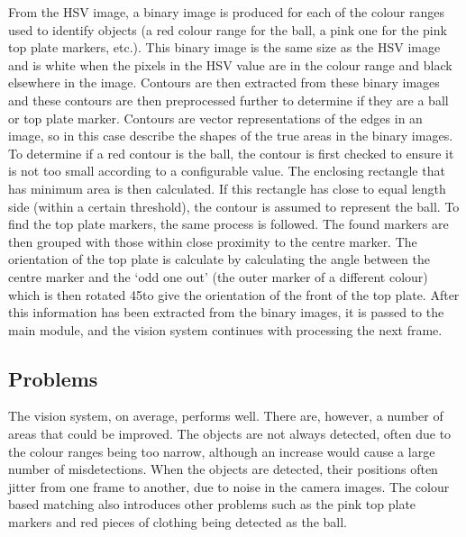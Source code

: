 From the HSV image, a binary image is produced for each of the colour ranges
used to identify objects (a red colour range for the ball, a pink one for the
pink top plate markers, etc.). This binary image is the same size as the HSV
image and is white when the pixels in the HSV value are in the colour range and
black elsewhere in the image.  Contours are then extracted from these binary
images and these contours are then preprocessed further to determine if they
are a ball or top plate marker.  Contours are vector representations of the
edges in an image, so in this case describe the shapes of the true areas in the
binary images. To determine if a red contour is the ball, the contour is first
checked to ensure it is not too small according to a configurable value. The
enclosing rectangle that has minimum area is then calculated. If this rectangle
has close to equal length side (within a certain threshold), the contour is
assumed to represent the ball. To find the top plate markers, the same process
is followed. The found markers are then grouped with those within close
proximity to the centre marker. The orientation of the top plate is calculate
by calculating the angle between the centre marker and the `odd one out' (the
outer marker of a different colour) which is then rotated 45\degree to give the
orientation of the front of the top plate.  After this information has been
extracted from the binary images, it is passed to the main module, and the
vision system continues with processing the next frame.



\subsection{Problems}

The vision system, on average, performs well. There are, however, a number of
areas that could be improved. The objects are not always detected, often due to
the colour ranges being too narrow, although an increase would cause a large
number of misdetections. When the objects are detected, their positions often
jitter from one frame to another, due to noise in the camera images. The colour
based matching also introduces other problems such as the pink top plate
markers and red pieces of clothing being detected as the ball.
